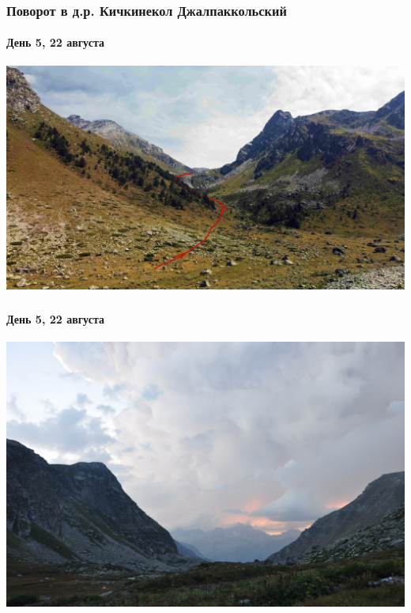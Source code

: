 \begin{frame}
	\frametitle{Поворот в д.р. Кичкинекол Джалпаккольский}
	\framesubtitle{День 5, 22 августа}
	\centering
	\includegraphics[width=\textwidth]{../pics/DJI_0835}			
\end{frame}


\begin{frame}
	\frametitle{\textAlpha\textpi \textomikron\textkappa\textalpha\textlambda\textnu\textpsi\textiota\textvarsigma}
	\framesubtitle{День 5, 22 августа}
	\centering
	\includegraphics[width=\textwidth]{../pics/DSC_0010}			
\end{frame} 

